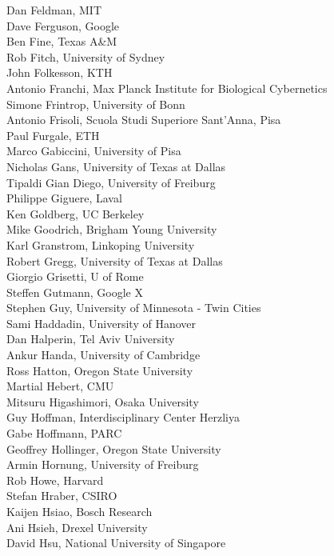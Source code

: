 \begin{multicols}{3}
{Dan Feldman, MIT\\
Dave Ferguson, Google\\
Ben Fine, Texas A\&M\\
Rob Fitch, University of Sydney\\
John Folkesson, KTH\\
Antonio Franchi, Max Planck Institute for Biological Cybernetics\\
Simone Frintrop, University of Bonn\\
Antonio Frisoli, Scuola Studi Superiore Sant'Anna, Pisa\\
Paul Furgale, ETH\\
Marco Gabiccini, University of Pisa\\
Nicholas Gans, University of Texas at Dallas\\
Tipaldi Gian Diego, University of Freiburg\\
Philippe Giguere, Laval\\
Ken Goldberg, UC Berkeley\\
Mike Goodrich, Brigham Young University\\
Karl Granstrom, Linkoping University\\
Robert Gregg, University of Texas at Dallas\\
Giorgio Grisetti, U of Rome\\
Steffen Gutmann, Google X\\
Stephen Guy, University of Minnesota - Twin Cities\\
Sami Haddadin, University of Hanover\\
Dan Halperin, Tel Aviv University\\
Ankur Handa, University of Cambridge\\
Ross Hatton, Oregon State University\\
Martial Hebert, CMU\\
Mitsuru Higashimori, Osaka University\\
Guy Hoffman, Interdisciplinary Center Herzliya\\
Gabe Hoffmann, PARC\\
Geoffrey Hollinger, Oregon State University\\
Armin Hornung, University of Freiburg\\
Rob Howe, Harvard\\
Stefan Hraber, CSIRO\\
Kaijen Hsiao, Bosch Research\\
Ani Hsieh, Drexel University\\
David Hsu, National University of Singapore\\
}
\end{multicols}
